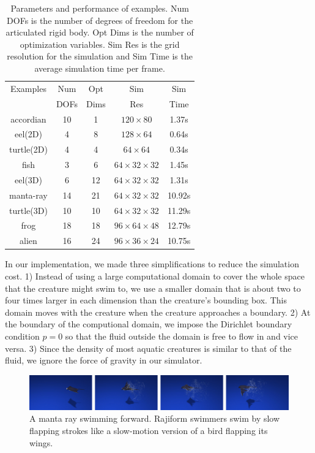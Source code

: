 \begin{table}
\centering
\begin{tabular}{|c|c|c|c|c|}
\hline
Examples & Num & Opt  & Sim  & Sim\\
         & DOFs & Dims & Res & Time \\
 \hline
accordian & 10 & 1 &  $120\times 80$           & 1.37s\\
eel(2D)   & 4  & 8 &  $128 \times 64$         &  0.64s \\
turtle(2D)& 4  & 4 & $64\times 64$           & 0.34s \\
fish      & 3  & 6  & $64\times 32\times 32$  & 1.45s\\
eel(3D)   & 6  & 12 &  $64\times 32\times 32$ & 1.31s\\
manta-ray & 14 & 21 &  $64\times 32\times 32$ & 10.92s\\
turtle(3D)& 10 & 10 &  $64\times 32\times 32$ & 11.29s\\
frog      & 18 & 18 &  $96\times 64\times 48$ & 12.79s\\
alien     & 16 & 24 &  $96\times 36\times 24$ & 10.75s\\

\hline
 \end{tabular}
 \caption{Parameters and performance of examples. Num DOFs is the number of degrees of freedom for the articulated rigid body. Opt Dims is the number of optimization variables. Sim Res is the grid resolution for the simulation and Sim Time is the average simulation time per frame.}
 \label{table:simData}
 \end{table}

In our implementation, we made three simplifications to reduce the
simulation cost. 1) Instead of using a large computational domain to cover
the whole space that the creature might swim to, we use a smaller domain
that is about two to four times larger in each dimension than the
creature's bounding box. This domain moves with the creature when the
creature approaches a boundary. 2) At the boundary of the computional
domain, we impose the Dirichlet boundary condition $p=0$ so that the fluid
outside the domain is free to flow in and vice versa. 3) Since the density
of most aquatic creatures is similar to that of the fluid, we ignore the force of gravity in our simulator.


\begin{figure}[ht]
\centering
\includegraphics[width=\textwidth]{figures/manta.eps}
\caption{A manta ray swimming forward. Rajiform swimmers swim by slow flapping strokes like a slow-motion version of a bird flapping its wings.}
\label{fig:manta}
\end{figure}

